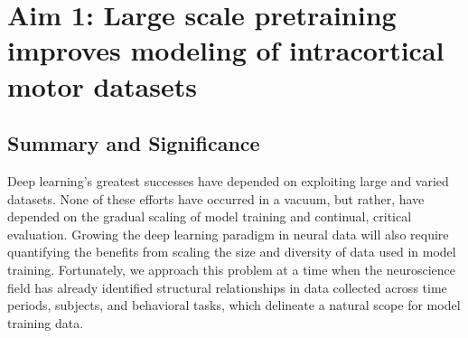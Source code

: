 \documentclass[12pt,oneside]{report}
\begin{document}



\chapter{Aim 1: Large scale pretraining improves modeling of intracortical motor datasets}

\section{Summary and Significance}

Deep learning’s greatest successes have depended on exploiting large and varied datasets. None of these efforts have occurred in a vacuum, but rather, have depended on the gradual scaling of model training and continual, critical evaluation. Growing the deep learning paradigm in neural data will also require quantifying the benefits from scaling the size and diversity of data used in model training. Fortunately, we approach this problem at a time when the neuroscience field has already identified structural relationships in data collected across time periods, subjects, and behavioral tasks, which delineate a natural scope for model training data.
\end{document}
